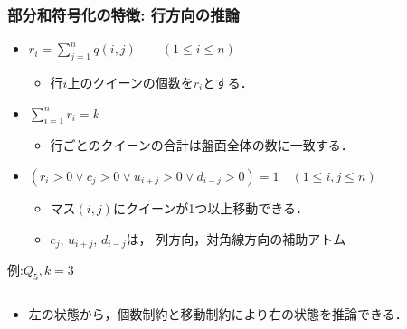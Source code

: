 \documentclass[dvipdfmx,10pt]{beamer}
\begin{document}
\begin{frame}\frametitle{部分和符号化の特徴: 行方向の推論}
  \begin{itemize}
   \item {}\quad $r_{i}=\sum\limits_{j=1}^{n} 
	      q(i,j) \qquad (1 \leq i \leq n)$ 
	 \begin{itemize}
	  \item 行$i$上のクイーンの個数を$r_i$とする．
	 \end{itemize}
   \item {}\quad $\sum\limits_{i=1}^{n}r_{i} = k$
	 \begin{itemize}
	  \item 行ごとのクイーンの合計は盤面全体の数に一致する．
	 \end{itemize}
   \item {}\quad $(r_{i}>0 \vee c_{j}>0 \vee 
	 u_{i+j}>0 \vee d_{i-j} > 0) =1  \quad (1\leq i,j \leq n)$ 
	 \begin{itemize}
	  \item マス$(i,j)$にクイーンが1つ以上移動できる．
	  \item $c_{j}$, $u_{i+j}$, $d_{i-j}$は，
		列方向，対角線方向の補助アトム
	 \end{itemize}
  \end{itemize}
 \begin{exampleblock}{例:$Q_{5},k=3$}
  \begin{columns}
   \begin{column}{0.45\textwidth}
    \centering
    \scalebox{1}{
    
    }
   \end{column}
   \begin{column}{0.45\textwidth}
    \centering
    \scalebox{1}{
    
    }
   \end{column}
  \end{columns}
  \begin{itemize}
   \item 左の状態から，個数制約と移動制約により右の状態を推論できる．
  \end{itemize}
 \end{exampleblock}
\end{frame}
\end{document}
